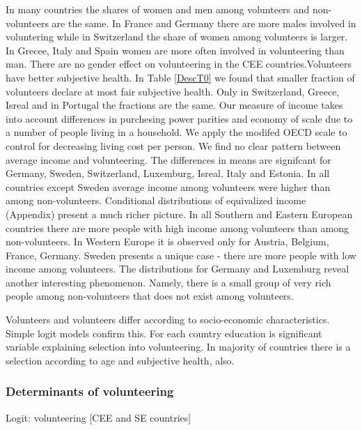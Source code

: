 \documentclass[10pt, letterpaper]{article}
\begin{document}
\begin{spacing}{1.4}
In many countries the shares of women and men among volunteers and non-volunteers are the same. In France and Germany there are more males involved in voluntering while in Switzerland the share of women among volunteers is larger. In Grecee, Italy and Spain women are more often involved in volunteering than man. There are no gender effect on volunteering in the CEE countries.Volunteers have better subjective health.  In Table \ref{DescT0} we found that smaller fraction of volunteers declare at most fair subjective health. Only in Switzerland, Greece, Isreal and in Portugal the fractions are the same.  Our measure of income takes into account differences in purchesing power parities and economy of scale due to a number of people living in a household. We apply the modifed OECD scale to control for decreasing living cost per person. We find no clear pattern between average income and volunteering. The differences in means are signifcant for Germany, Sweden, Switzerland, Luxemburg, Isreal, Italy and Estonia. In all countries except Sweden average income among volunteers were higher than among non-volunteers. Conditional distributions of equivalized income (Appendix) present a much richer picture. In all Southern and Eastern European countries there are more people with high income among volunteers than among non-volunteers. In  Western Europe it is observed only for  Austria, Belgium, France, Germany. Sweden presents a unique case - there are more people with low income among volunteers. The distributions for Germany and Luxemburg reveal another interesting phenomenon. Namely, there is a small group of very rich people among non-volunteers that does not exist among volunteers.

Volunteers and volunteers differ according to socio-economic characteristics. Simple logit models confirm this. For each country education is significant variable explaining selection into volunteering. In majority of countries there is a selection according to age and subjective health, also. 

\subsubsection{Determinants of volunteering}




\begin{spacing}{.9}
\begin{table}[H]
\centering 
\caption{Logit: volunteering [CEE and SE countries]}  
\begin{small} 
	 
      \label{logitCEE} 
\end{small}
\end{table}
\end{spacing}


\end{spacing}
\end{document}
